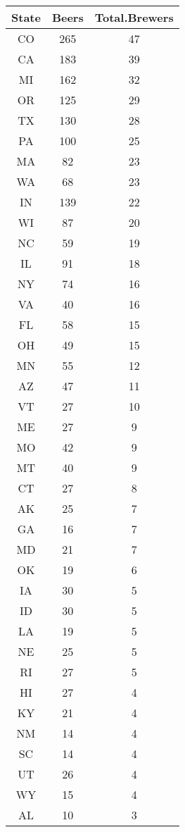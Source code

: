 \documentclass[]{article}
\begin{document}
\begin{table}[H]
\centering
\begin{tabular}{c|c|c}
\hline
State & Beers & Total.Brewers\\
\hline
CO & 265 & 47\\
\hline
CA & 183 & 39\\
\hline
MI & 162 & 32\\
\hline
OR & 125 & 29\\
\hline
TX & 130 & 28\\
\hline
PA & 100 & 25\\
\hline
MA & 82 & 23\\
\hline
WA & 68 & 23\\
\hline
IN & 139 & 22\\
\hline
WI & 87 & 20\\
\hline
NC & 59 & 19\\
\hline
IL & 91 & 18\\
\hline
NY & 74 & 16\\
\hline
VA & 40 & 16\\
\hline
FL & 58 & 15\\
\hline
OH & 49 & 15\\
\hline
MN & 55 & 12\\
\hline
AZ & 47 & 11\\
\hline
VT & 27 & 10\\
\hline
ME & 27 & 9\\
\hline
MO & 42 & 9\\
\hline
MT & 40 & 9\\
\hline
CT & 27 & 8\\
\hline
AK & 25 & 7\\
\hline
GA & 16 & 7\\
\hline
MD & 21 & 7\\
\hline
OK & 19 & 6\\
\hline
IA & 30 & 5\\
\hline
ID & 30 & 5\\
\hline
LA & 19 & 5\\
\hline
NE & 25 & 5\\
\hline
RI & 27 & 5\\
\hline
HI & 27 & 4\\
\hline
KY & 21 & 4\\
\hline
NM & 14 & 4\\
\hline
SC & 14 & 4\\
\hline
UT & 26 & 4\\
\hline
WY & 15 & 4\\
\hline
AL & 10 & 3\\

\end{tabular}
\end{table}
\end{document}
